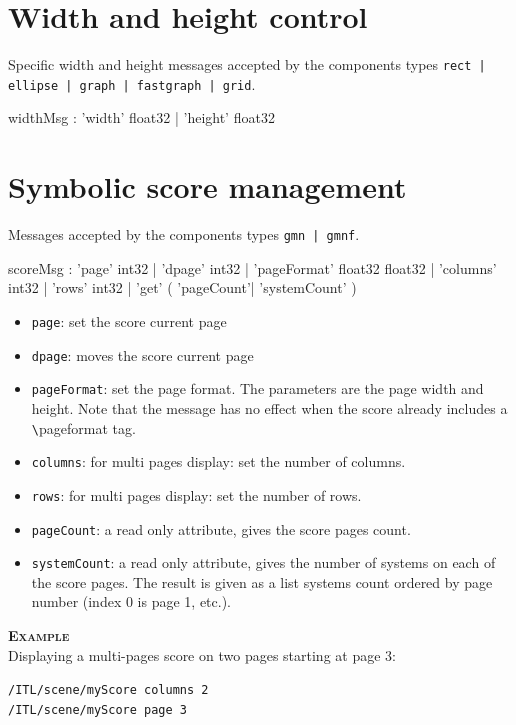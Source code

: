 \documentclass[a4paper,twoside]{report}
\newcommand{\sublevel}[1]	{\section{#1}}
\newcommand{\OSC}[1]		{\texttt{#1}}
\newcommand{\example}		{\textbf{\hspace{-1.5cm}\textbf{\textsc{Example }}}}
\newcommand{\sample}	[1]			{\vspace{-2mm}\begin{center}\colorbox{mygrey}{
								\begin{minipage}[t]{0.9\columnwidth} 
								{\small \texttt{#1}}
								\end{minipage}}\end{center}}
\begin{document}
\sublevel{Width and height control}

Specific width and height messages accepted by the components types \OSC{rect | ellipse | graph | fastgraph | grid}.

\begin{rail}
widthMsg :  'width' float32
			| 'height' float32
\end{rail}



\sublevel{Symbolic score management}
\label{gmnpage}

Messages accepted by the components types \OSC{gmn | gmnf}. 
\begin{rail}
scoreMsg :      'page' int32
			| 'dpage' int32
			| 'pageFormat' float32 float32
			| 'columns' int32
			| 'rows' int32
			| 'get' ( 'pageCount'| 'systemCount' )
\end{rail}


\begin{itemize}
\item \OSC{page}: set the score current page
\item \OSC{dpage}: moves the score current page
\item \OSC{pageFormat}: set the page format. The parameters are the page width and height. Note that the message has no effect when the score already includes a \verb+\+pageformat tag.
\item \OSC{columns}: for multi pages display: set the number of columns.
\item \OSC{rows}: for multi pages display: set the number of rows.
\item \OSC{pageCount}:  a read only attribute, gives the score pages count.
\item \OSC{systemCount}:  a read only attribute, gives the number of systems on each of the score pages. The result is given as a list systems count ordered by page number (index 0 is page 1, etc.).
\end{itemize}

\example \\
Displaying a multi-pages score on two pages starting at page 3:
\sample{/ITL/scene/myScore columns 2 \\
/ITL/scene/myScore page 3
}
\end{document}
